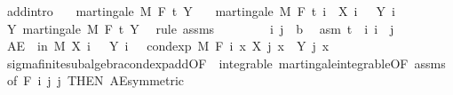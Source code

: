 \begin{isabellebody}
\endisatagproof
{\isafoldproof}%
%
\isadelimproof
\isanewline
%
\endisadelimproof
\isanewline
{}\isamarkupfalse%
\ add{\isacharbrackleft}{\kern0pt}intro{\isacharbrackright}{\kern0pt}{\isacharcolon}{\kern0pt}\isanewline
\ \ \ {\isachardoublequoteopen}martingale\ M\ F\ t\ Y{\isachardoublequoteclose}\isanewline
\ \ \ {\isachardoublequoteopen}martingale\ M\ F\ t\ {\isacharparenleft}{\kern0pt}{\isasymlambda}i\ {\isasymxi}{\isachardot}{\kern0pt}\ X\ i\ {\isasymxi}\ {\isacharplus}{\kern0pt}\ Y\ i\ {\isasymxi}{\isacharparenright}{\kern0pt}{\isachardoublequoteclose}\isanewline
%
\isadelimproof
%
\endisadelimproof
%
\isatagproof
{}\isamarkupfalse%
\ {\isacharminus}{\kern0pt}\isanewline
\ \ \isamarkupfalse%
\ Y{\isacharcolon}{\kern0pt}\ martingale\ M\ F\ t\ Y\ \isamarkupfalse%
\ {\isacharparenleft}{\kern0pt}rule\ assms{\isacharparenright}{\kern0pt}\isanewline
\ \ \isacommand{{\isacharbraceleft}{\kern0pt}}\isamarkupfalse%
\isanewline
\ \ \ \ \isamarkupfalse%
\ i\ j\ {\isacharcolon}{\kern0pt}{\isacharcolon}{\kern0pt}\ {\isacharprime}{\kern0pt}b\ \isamarkupfalse%
\ asm{\isacharcolon}{\kern0pt}\ {\isachardoublequoteopen}t\ {\isasymle}\ i{\isachardoublequoteclose}\ {\isachardoublequoteopen}i\ {\isasymle}\ j{\isachardoublequoteclose}\isanewline
\ \ \ \ \isamarkupfalse%
\ {\isachardoublequoteopen}AE\ {\isasymxi}\ in\ M{\isachardot}{\kern0pt}\ X\ i\ {\isasymxi}\ {\isacharplus}{\kern0pt}\ Y\ i\ {\isasymxi}\ {\isacharequal}{\kern0pt}\ cond{\isacharunderscore}{\kern0pt}exp\ M\ {\isacharparenleft}{\kern0pt}F\ i{\isacharparenright}{\kern0pt}\ {\isacharparenleft}{\kern0pt}{\isasymlambda}x{\isachardot}{\kern0pt}\ X\ j\ x\ {\isacharplus}{\kern0pt}\ Y\ j\ x{\isacharparenright}{\kern0pt}\ {\isasymxi}{\isachardoublequoteclose}\ \isanewline
\ \ \ \ \ \ \isamarkupfalse%
\ sigma{\isacharunderscore}{\kern0pt}finite{\isacharunderscore}{\kern0pt}subalgebra{\isachardot}{\kern0pt}cond{\isacharunderscore}{\kern0pt}exp{\isacharunderscore}{\kern0pt}add{\isacharbrackleft}{\kern0pt}OF\ {\isacharunderscore}{\kern0pt}\ integrable\ martingale{\isachardot}{\kern0pt}integrable{\isacharbrackleft}{\kern0pt}OF\ assms{\isacharbrackright}{\kern0pt}{\isacharcomma}{\kern0pt}\ of\ {\isachardoublequoteopen}F\ i{\isachardoublequoteclose}\ j\ j{\isacharcomma}{\kern0pt}\ THEN\ AE{\isacharunderscore}{\kern0pt}symmetric{\isacharbrackright}{\kern0pt}\isanewline

\end{isabellebody}
